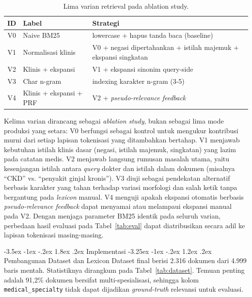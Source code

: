 \documentclass[a4paper,12pt]{article}
\makeatletter
\renewcommand{\section}{\@startsection{section}{1}{\z@}%
  {-3.5ex \@plus -1ex \@minus -.2ex}%
  {1.8ex \@plus .2ex}%
  {\normalfont\normalsize\bfseries}}
\renewcommand{\subsection}{\@startsection{subsection}{2}{\z@}%
  {-3.25ex \@plus -1ex \@minus -.2ex}%
  {1.2ex \@plus .2ex}%
  {\normalfont\normalsize\bfseries}}
\makeatother
\begin{document}
\begin{table}[h]
  \centering
  \caption{Lima varian retrieval pada ablation study.}
  \label{tab:varian}
  \begin{tabular}{|c|l|p{8.2cm}|}
    \hline
    \textbf{ID} & \textbf{Label} & \textbf{Strategi} \\
    \hline
    V0 & Naive BM25 & lowercase + hapus tanda baca (baseline) \\
    \hline
    V1 & Normalisasi klinis & V0 + negasi dipertahankan + istilah majemuk + ekspansi singkatan \\
    \hline
    V2 & Klinis + ekspansi & V1 + ekspansi sinonim query-side \\
    \hline
    V3 & Char n-gram & indexing karakter n-gram (3-5) \\
    \hline
    V4 & Klinis + ekspansi + PRF & V2 + \textit{pseudo-relevance feedback} \\
    \hline
  \end{tabular}
\end{table}

Kelima varian dirancang sebagai \textit{ablation study}, bukan sebagai lima mode produksi yang setara: V0 berfungsi sebagai kontrol untuk mengukur kontribusi murni dari setiap lapisan tokenisasi yang ditambahkan bertahap. V1 menjawab kebutuhan istilah klinis dasar (negasi, istilah majemuk, singkatan) yang lazim pada catatan medis. V2 menjawab langsung rumusan masalah utama, yaitu kesenjangan istilah antara \textit{query} dokter dan istilah dalam dokumen (misalnya ``CKD'' vs. ``penyakit ginjal kronis''). V3 diuji sebagai pendekatan alternatif berbasis karakter yang tahan terhadap variasi morfologi dan salah ketik tanpa bergantung pada \textit{lexicon} manual. V4 menguji apakah ekspansi otomatis berbasis \textit{pseudo-relevance feedback} dapat menyamai atau melampaui ekspansi manual pada V2. Dengan menjaga parameter BM25 identik pada seluruh varian, perbedaan hasil evaluasi pada Tabel~\ref{tab:eval} dapat diatribusikan secara adil ke lapisan tokenisasi masing-masing.

\section{Implementasi}
\subsection{Pembangunan Dataset dan Lexicon}
Dataset final berisi 2.316 dokumen dari 4.999 baris mentah. Statistiknya dirangkum pada Tabel~\ref{tab:dataset}. Temuan penting adalah 91,2\% dokumen bersifat multi-spesialisasi, sehingga kolom \texttt{medical\_specialty} tidak dapat dijadikan \textit{ground-truth} relevansi untuk evaluasi.
\end{document}
